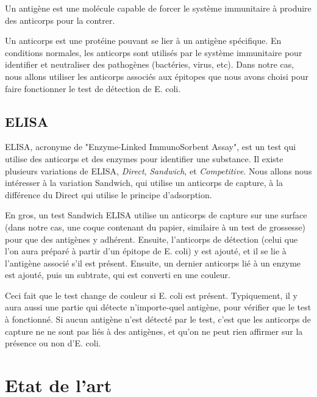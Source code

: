 \documentclass{article}
\begin{document}
      Un antigène est une molécule capable de forcer le système immunitaire à produire des anticorps pour la contrer.
      
      Un anticorps est une protéine pouvant se lier à un antigène spécifique. En conditions normales, les anticorps sont utilisés par le système immunitaire pour identifier et neutraliser des pathogènes (bactéries, virus, etc). Dans notre cas, nous allons utiliser les anticorps associés aux épitopes que nous avons choisi pour faire fonctionner le test de détection de E. coli.
      
    \subsection{ELISA}
      ELISA, acronyme de "Enzyme-Linked ImmunoSorbent Assay", est un test qui utilise des anticorps et des enzymes pour identifier une substance. Il existe plusieurs variations de ELISA, \textit{Direct}, \textit{Sandwich}, et \textit{Competitive}. Nous allons nous intéresser à la variation Sandwich, qui utilise un anticorps de capture, à la différence du Direct qui utilise le principe d'adsorption.
      
      En gros, un test Sandwich ELISA utilise un anticorps de capture sur une surface (dans notre cas, une coque contenant du papier, similaire à un test de grossesse) pour que des antigènes y adhérent. Ensuite, l'anticorps de détection (celui que l'on aura préparé à partir d'un épitope de E. coli) y est ajouté, et il se lie à l'antigène associé s'il est présent. Ensuite, un dernier anticorps lié à un enzyme est ajouté, puis un subtrate, qui est converti en une couleur.
      
      Ceci fait que le test change de couleur si E. coli est présent. Typiquement, il y aura aussi une partie qui détecte n'importe-quel antigène, pour vérifier que le test à fonctionné. Si aucun antigène n'est détecté par le test, c'est que les anticorps de capture ne ne sont pas liés à des antigènes, et qu'on ne peut rien affirmer sur la présence ou non d'E. coli.
      
  \section{Etat de l'art}
  
\end{document}
